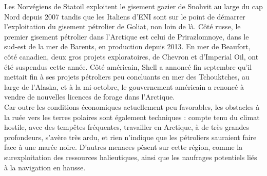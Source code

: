 \documentclass[8pt]{article}
\begin{document}
\begin{center}
\end{center}

Les Norvégiens de Statoil exploitent le gisement gazier de Snohvit au large du cap Nord depuis 2007 tandis que les Italiens d’ENI sont sur le point de démarrer l’exploitation du gisement pétrolier de Goliat, non loin de là. Côté russe, le premier gisement pétrolier dans l’Arctique est celui de Prirazlomnoye, dans le sud-est de la mer de Barents, en production depuis 2013. En mer de Beaufort, côté canadien, deux gros projets exploratoires, de Chevron et d’Imperial Oil, ont été suspendus cette année. Côté américain, Shell a annoncé fin septembre qu’il mettait fin à ses projets pétroliers peu concluants en mer des Tchouktches, au large de l’Alaska, et à la mi-octobre, le gouvernement américain a renoncé à vendre de nouvelles licences de forage dans l’Arctique.\\

Car outre les conditions économiques actuellement peu favorables, les obstacles à la ruée vers les terres polaires sont également techniques : compte tenu du climat hostile, avec des tempêtes fréquentes, travailler en Arctique, à de très grandes profondeurs, s’avère très ardu, et rien n’indique que les pétroliers sauraient faire face à une marée noire. D’autres menaces pèsent sur cette région, comme la surexploitation des ressources halieutiques, ainsi que les naufrages potentiels liés à la navigation en hausse.\\
\end{document}
